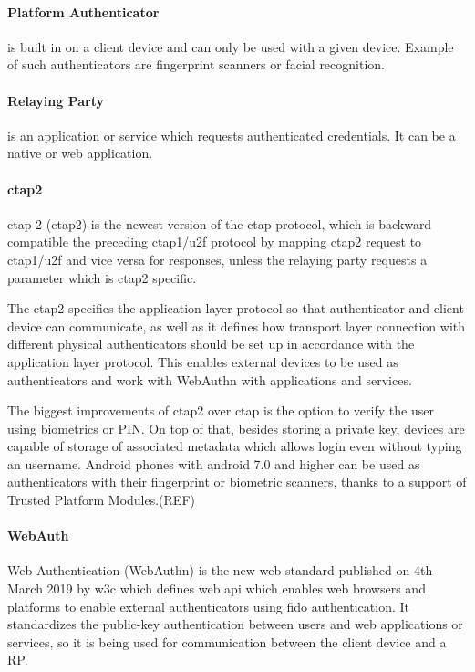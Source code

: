 \paragraph{Platform Authenticator} 
is built in on a client device and can only be used with a given device. Example of such authenticators are fingerprint scanners or facial recognition.

\paragraph{Relaying Party} 
is an application or service which requests authenticated credentials. It can be a native or web application.

\paragraph{\acrshort{ctap}2}
\acrlong{ctap} 2 (\acrshort{ctap}2) is the newest version of the \acrshort{ctap} protocol, which is backward compatible the preceding \acrshort{ctap}1/\acrshort{u2f} protocol by mapping \acrshort{ctap}2 request to \acrshort{ctap}1/\acrshort{u2f} and vice versa for responses, unless the relaying party requests a parameter which is \acrshort{ctap}2 specific. 

The \acrshort{ctap}2 specifies the application layer protocol so that authenticator and client device can communicate, as well as it defines how transport layer connection with different physical authenticators should be set up in accordance with the application layer protocol. This enables external devices to be used as authenticators and work with WebAuthn with applications and services.

The biggest improvements of \acrshort{ctap}2 over \acrshort{ctap} is the option to verify the user using biometrics or PIN. On top of that, besides storing a private key, devices are capable of storage of associated metadata which allows login even without typing an username. Android phones with android 7.0 and higher can be used as authenticators with their fingerprint or biometric scanners, thanks to a support of Trusted Platform Modules.(REF)

\paragraph{WebAuth} 
Web Authentication (WebAuthn) is the new web standard published on 4th March 2019  by \acrshort{w3c} which defines web \acrshort{api} which enables web browsers and platforms to enable external authenticators using \acrshort{fido} authentication. It standardizes the public-key authentication between users and web applications or services, so it is being used for communication between the client device and a RP.

